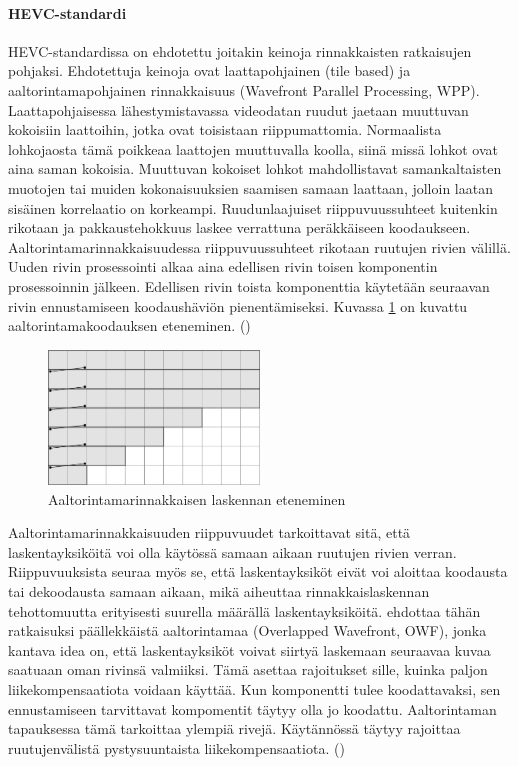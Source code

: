 \setcounter{secnumdepth}{5}

\paragraph{HEVC-standardi}
HEVC-standardissa on ehdotettu joitakin keinoja rinnakkaisten
ratkaisujen pohjaksi. Ehdotettuja keinoja ovat laattapohjainen (tile based) ja
aaltorintamapohjainen rinnakkaisuus (Wavefront Parallel Processing, WPP).
Laattapohjaisessa lähestymistavassa videodatan ruudut jaetaan muuttuvan
kokoisiin laattoihin, jotka ovat toisistaan riippumattomia. Normaalista
lohkojaosta tämä poikkeaa laattojen muuttuvalla koolla, siinä missä lohkot
ovat aina saman kokoisia. Muuttuvan kokoiset lohkot mahdollistavat
samankaltaisten muotojen tai muiden kokonaisuuksien saamisen samaan laattaan,
jolloin laatan sisäinen korrelaatio on korkeampi. Ruudunlaajuiset
riippuvuussuhteet kuitenkin rikotaan ja pakkaustehokkuus laskee verrattuna
peräkkäiseen koodaukseen. Aaltorintamarinnakkaisuudessa riippuvuussuhteet
rikotaan ruutujen rivien välillä. Uuden rivin prosessointi alkaa aina edellisen
rivin toisen komponentin prosessoinnin jälkeen. Edellisen rivin toista
komponenttia käytetään seuraavan rivin ennustamiseen koodaushäviön
pienentämiseksi. Kuvassa \ref{fig:wpp} on kuvattu aaltorintamakoodauksen
eteneminen. (\citealt{chi})

\begin{figure}[ht]
	\centering
	\includegraphics[width=0.5\textwidth]{WPP.jpg}
	\caption{Aaltorintamarinnakkaisen laskennan eteneminen}
	\label{fig:wpp}
\end{figure}

Aaltorintamarinnakkaisuuden riippuvuudet tarkoittavat sitä, että
laskentayksiköitä voi olla käytössä samaan aikaan ruutujen rivien verran.
Riippuvuuksista seuraa myös se, että laskentayksiköt eivät voi aloittaa
koodausta tai dekoodausta samaan aikaan, mikä aiheuttaa rinnakkaislaskennan
tehottomuutta erityisesti suurella määrällä laskentayksiköitä.
\citealt{chi} ehdottaa tähän ratkaisuksi päällekkäistä
aaltorintamaa (Overlapped Wavefront, OWF), jonka kantava idea on, että
laskentayksiköt voivat siirtyä laskemaan seuraavaa kuvaa saatuaan oman rivinsä
valmiiksi. Tämä asettaa rajoitukset sille, kuinka paljon liikekompensaatiota
voidaan käyttää. Kun komponentti tulee koodattavaksi, sen ennustamiseen
tarvittavat kompomentit täytyy olla jo koodattu. Aaltorintaman tapauksessa
tämä tarkoittaa ylempiä rivejä. Käytännössä täytyy rajoittaa ruutujenvälistä
pystysuuntaista liikekompensaatiota. (\citealt{chi})

